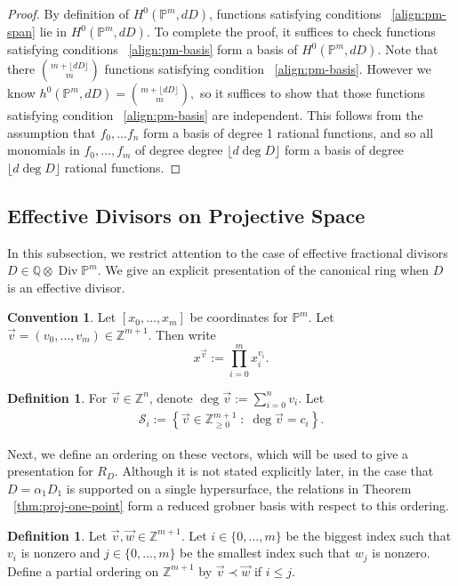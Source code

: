\documentclass{amsart}
\theoremstyle{plain}
\theoremstyle{definition}
\newtheorem{defn}[thm]{Definition}
\newtheorem{convention}[thm]{Convention}
\theoremstyle{remark}
\numberwithin{equation}{section}
\newcommand\ssec{\subsection}
\newcommand\bq{{\mathbb Q}}
\newcommand\bp{{\mathbb P}}
\newcommand\bz{{\mathbb Z}}
\DeclareMathOperator\di{Div}
\newcommand\mss{\mathscr{S}}
\begin{document}
\begin{proof}
By definition of $H^0(\bp^m,dD)$, functions satisfying conditions 
~\eqref{align:pm-span} lie in $H^0(\bp^m,dD)$. To complete the proof, it
suffices to check functions satisfying conditions ~\eqref{align:pm-basis} form
a basis of $H^0(\bp^m,dD)$. Note that there $\binom{m+ \lfloor dD \rfloor }{m}$
functions satisfying condition ~\eqref{align:pm-basis}. However we know
$h^0(\bp^m,dD) = \binom{m+ \lfloor dD \rfloor }{m},$ so it suffices to show
that those functions satisfying condition ~\eqref{align:pm-basis} are
independent. This follows from the assumption that $f_0,\ldots f_n$ form a
basis of degree 1 rational functions, and so all monomials in $f_0,\ldots, f_m$ of degree degree $\lfloor d \deg D \rfloor $
form a basis of degree $\lfloor d \deg D \rfloor$ rational functions.
\end{proof}

\ssec{Effective Divisors on Projective Space}
\label{ssec:proj-one-point}

In this subsection, we restrict attention to the case of effective
fractional divisors $D \in \bq \otimes \di \bp^m$. We give an explicit presentation of the canonical ring when $D$ is an effective
divisor.

\begin{convention}
Let $[x_0, \ldots, x_m]$ be coordinates for $\bp^m$. Let
$\vec{v} = (v_0, \ldots, v_m) \in \bz^{m + 1}$.  Then write
\[
	x^{\vec{v}} := \prod_{i = 0}^{m} x_i^{v_i}.
\]
\end{convention}

\begin{defn}
\label{defn:vec-sum}
For $\vec{v} \in \bz^n$, denote $\deg \vec{v} := \sum_{i = 0}
^n v_i$.
Let 
\begin{align*}
	\mss_i := \left \{\vec{v} \in \bz_{\geq 0}^{m + 1} \; : \;
\deg \vec v = c_i \right\}.	
\end{align*}

\noindent
\end{defn}

Next, we define an ordering on these vectors, which will be used to give a presentation for $R_D$. Although it is not
stated explicitly later, in the case that $D = \alpha_1 D_1$ is supported on a single hypersurface, the relations in Theorem ~\ref{thm:proj-one-point} form a reduced grobner basis with respect to this ordering.

\begin{defn}
\label{defn:vec-order}
Let $\vec{v}, \vec{w} \in \bz^{m+1}$. Let $i \in \{0,\ldots, m\}$
be the biggest index such that $v_i$ is nonzero
and $j \in \{0,\ldots, m\}$ be the smallest index such that $w_j$ is
nonzero. Define a partial ordering on $\bz^{m+1}$ by $\vec{v} \prec \vec{w}$ if $i \leq j$.
\end{defn}
\end{document}
